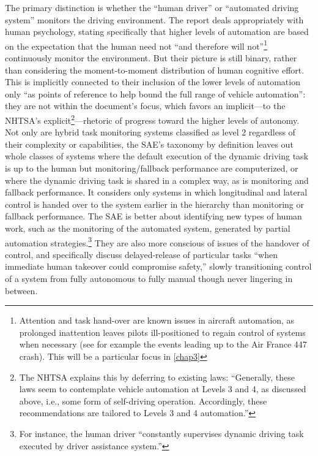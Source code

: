 The primary distinction is whether the ``human driver'' or ``automated
driving system'' monitors the driving environment.\cite{???} The report deals
appropriately with human psychology, stating specifically that higher
levels of automation are based on the expectation that the human need
not ``and therefore will not''\footnote{Attention and task hand-over are
  known issues in aircraft automation, as prolonged inattention leaves
  pilots ill-positioned to regain control of systems when necessary
  (see for example the events leading up to the Air France 447
  crash). This will be a particular focus in \ref{chap3}} continuously
monitor the environment.\cite{???} But their 
picture is still binary, rather than considering the moment-to-moment
distribution of human 
cognitive effort. This is implicitly connected to their inclusion of
the lower levels of automation only ``as points of reference to help
bound the full range of vehicle automation''\cite{???}: they are not within
the document's focus, which favors an implicit---to the NHTSA's
explicit\footnote{The NHTSA explains this by deferring to existing
  laws: ``Generally, these laws seem to contemplate vehicle 
automation at Levels 3 and 4, as discussed above, i.e., some form of
self-driving operation. 
Accordingly, these recommendations are tailored to Levels 3 and 4
automation.''\cite[p. 10]{???}}---rhetoric of progress toward the
higher levels of autonomy. 
Not only are hybrid task monitoring systems classified as level 2
regardless of their complexity or capabilities, the SAE's taxonomy by
definition leaves out whole classes of systems where the default
execution of the dynamic driving task is up to the human but
monitoring/fallback performance are computerized, or where the dynamic
driving task is shared in a complex way, as is monitoring and fallback
performance. It considers only systems in which longitudinal and
lateral control is handed over to the system earlier in the hierarchy
than monitoring or fallback performance. The SAE is better about
identifying new types of human work, such as the monitoring of the
automated system, generated by partial automation
strategies.\footnote{For instance, the human driver ``constantly
  supervises dynamic driving task executed by driver assistance
  system.''\cite[p. 3]{???}} They
are also more conscious of issues of the handover of control, and
specifically discuss delayed-release of particular tasks ``when
immediate human takeover could compromise safety,'' slowly
transitioning control of a system from fully autonomous to fully
manual though never lingering in between.\cite{???} 

